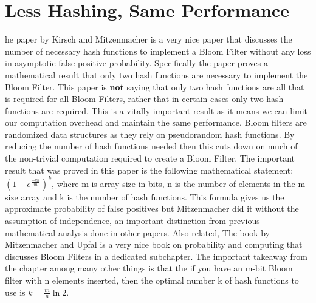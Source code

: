 \documentclass[MScCS]{uccthesis}
\begin{document}
\section{Less Hashing, Same Performance}
he paper by  Kirsch and Mitzenmacher \cite{kirsch2006less} is a very nice paper that discusses the number of necessary hash functions to implement a Bloom Filter without any loss in asymptotic false positive probability. Specifically the paper proves a mathematical result that only two hash functions are necessary to implement the Bloom Filter. This paper is \textbf{not} saying that only two hash functions are all that is required for all Bloom Filters, rather that in certain cases only two hash functions are required. This is a vitally important result as it means we can limit our computation overhead and maintain the same performance. Bloom filters are randomized data structures as they rely on pseudorandom hash functions. By reducing the number of hash functions needed then this cuts down on much of the non-trivial computation required to create a Bloom Filter. The important result that was proved in this paper is the following mathematical statement: $(1-e^\frac{-kn}{m})^k$, where m is array size in bits, n is the number of elements in the m size array and k is the number of hash functions. This formula gives us the approximate probability of false positives but Mitzenmacher did it without the assumption of independence, an important distinction from previous mathematical analysis done in other papers. Also related, The book by Mitzenmacher and Upfal \cite{mitzenmacher2017probability} is a very nice book on probability and computing that discusses Bloom Filters in a dedicated subchapter. The important takeaway from the chapter among many other things is that the if you have an m-bit Bloom filter with n elements inserted, then the optimal number k of hash functions to use is $k = \frac{m}{n}\ln 2$.
\end{document}

